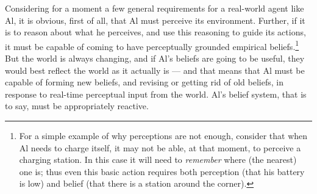 \documentclass{llncs}
\begin{document}
%
%

Considering for a moment a few general requirements for a real-world agent
like Al, it is obvious, first of all, that Al must perceive its
environment.  Further, if it is to reason about what he perceives, and use
this reasoning to guide its actions, it must be capable of coming to have
perceptually grounded empirical beliefs.\footnote{For a simple example of
  why perceptions are not enough, consider that when Al needs to charge
  itself, it may not be able, at that moment, to perceive a charging
  station.  In this case it will need to {\em remember} where (the nearest)
  one is; thus even this basic action requires both perception (that his
  battery is low) and belief (that there is a station around the corner).}
But the world is always changing, and if Al's beliefs are going to be
useful, they would best reflect the world as it actually is --- and that
means that Al must be capable of forming new beliefs, and revising or
getting rid of old beliefs, in response to real-time perceptual input from
the world.  Al's belief system, that is to say, must be appropriately
reactive.
\end{document}

